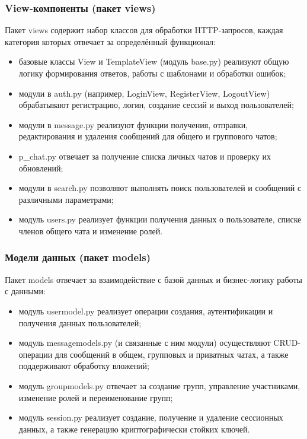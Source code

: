 \subsubsection{View-компоненты (пакет views)}
Пакет views содержит набор классов для обработки HTTP-запросов, каждая категория которых отвечает за определённый функционал:
\begin{itemize}
	\item базовые классы View и TemplateView (модуль base.py) реализуют общую логику формирования ответов, работы с шаблонами и обработки ошибок;
	\item модули в auth.py (например, LoginView, RegisterView, LogoutView) обрабатывают регистрацию, логин, создание сессий и выход пользователей;
	\item модули в message.py реализуют функции получения, отправки, редактирования и удаления сообщений для общего и группового чатов;
	\item p\_chat.py отвечает за получение списка личных чатов и проверку их обновлений;
	\item модули в search.py позволяют выполнять поиск пользователей и сообщений с различными параметрами;
	\item модуль users.py реализует функции получения данных о пользователе, списке членов общего чата и изменение ролей.
\end{itemize}

\subsubsection{Модели данных (пакет models)}
Пакет models отвечает за взаимодействие с базой данных и бизнес-логику работы с данными:
\begin{itemize}
	\item модуль usermodel.py реализует операции создания, аутентификации и получения данных пользователей;
	\item модуль messagemodels.py (и связанные с ним модули) осуществляют CRUD-операции для сообщений в общем, групповых и приватных чатах, а также поддерживают обработку вложений;
	\item модуль groupmodels.py отвечает за создание групп, управление участниками, изменение ролей и переименование групп;
	\item модуль session.py реализует создание, получение и удаление сессионных данных, а также генерацию криптографически стойких ключей.
\end{itemize}

